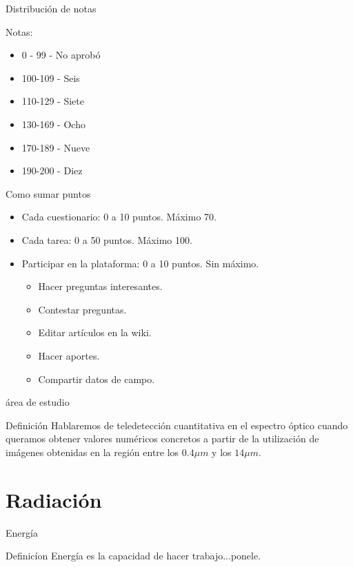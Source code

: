 \documentclass[handout]{beamer}
\begin{document}
\begin{frame}{Distribución de notas}
    \begin{block}{Notas:}
      \begin{itemize}
        \item 0 - 99 - No aprobó
        \item 100-109 - Seis
        \item 110-129 - Siete
        \item 130-169 - Ocho
        \item 170-189 - Nueve
        \item 190-200 - Diez
      \end{itemize}
    \end{block}
\end{frame}

\begin{frame}{Como sumar puntos}
  \begin{itemize}[<+>]
    \item Cada cuestionario: 0 a 10 puntos. Máximo 70.
    \item Cada tarea: 0 a 50 puntos. Máximo 100.
    \item Participar en la plataforma: 0 a 10 puntos. Sin máximo.
    \begin{itemize}
      \item Hacer preguntas interesantes.
      \item Contestar preguntas.
      \item Editar artículos en la wiki.
      \item Hacer aportes.
      \item Compartir datos de campo.
    \end{itemize}
  \end{itemize}
\end{frame}

\begin{frame}{área de estudio}
  \begin{block}{Definición}
    Hablaremos de teledetección cuantitativa en el espectro óptico cuando queramos obtener valores numéricos concretos a partir de la utilización de imágenes obtenidas en la región entre los $0.4\mu m$ y los $14\mu m$.
  \end{block}
\end{frame}

\section{Radiación}
\label{sec:radiacion}
\begin{frame}{Energía}
  \begin{block}{Definicíon}
    Energía es la capacidad de hacer trabajo...\pause ponele.
  \end{block}
\end{frame}
\end{document}
